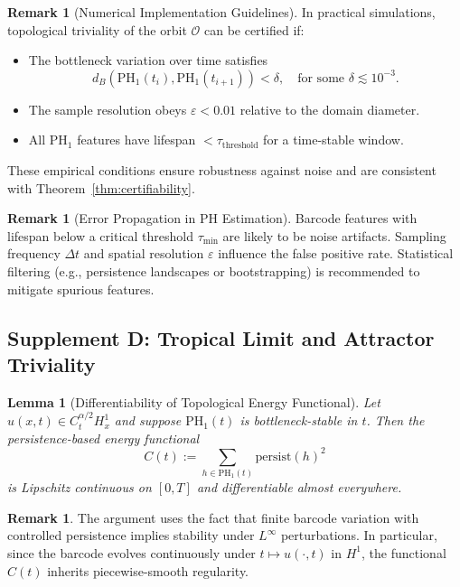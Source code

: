 \documentclass[11pt]{article}
\newtheorem{lemma}[theorem]{Lemma}
\theoremstyle{definition}
\newtheorem{remark}[theorem]{Remark}
\begin{document}
\begin{remark}[Numerical Implementation Guidelines]
In practical simulations, topological triviality of the orbit $\mathcal{O}$ can be certified if:
\begin{itemize}
    \item The bottleneck variation over time satisfies
    \[
    d_B(\mathrm{PH}_1(t_i), \mathrm{PH}_1(t_{i+1})) < \delta, \quad \text{for some } \delta \lesssim 10^{-3}.
    \]
    \item The sample resolution obeys $\varepsilon < 0.01$ relative to the domain diameter.
    \item All $\mathrm{PH}_1$ features have lifespan $< \tau_\text{threshold}$ for a time-stable window.
\end{itemize}
These empirical conditions ensure robustness against noise and are consistent with Theorem~\ref{thm:certifiability}.
\end{remark}

\begin{remark}[Error Propagation in PH Estimation]
Barcode features with lifespan below a critical threshold $\tau_{\text{min}}$ are likely to be noise artifacts. Sampling frequency $\Delta t$ and spatial resolution $\varepsilon$ influence the false positive rate. Statistical filtering (e.g., persistence landscapes or bootstrapping) is recommended to mitigate spurious features.
\end{remark}

\subsection{Supplement D: Tropical Limit and Attractor Triviality}

\begin{lemma}[Differentiability of Topological Energy Functional]
\label{lem:Ct_differentiable}
Let $u(x,t) \in C^{\alpha/2}_t H^1_x$ and suppose $\mathrm{PH}_1(t)$ is bottleneck-stable in $t$. Then the persistence-based energy functional
\[
C(t) := \sum_{h \in \mathrm{PH}_1(t)} \mathrm{persist}(h)^2
\]
is Lipschitz continuous on $[0,T]$ and differentiable almost everywhere.
\end{lemma}

\begin{remark}
The argument uses the fact that finite barcode variation with controlled persistence implies stability under $L^\infty$ perturbations. In particular, since the barcode evolves continuously under $t \mapsto u(\cdot,t)$ in $H^1$, the functional $C(t)$ inherits piecewise-smooth regularity.
\end{remark}
\end{document}
